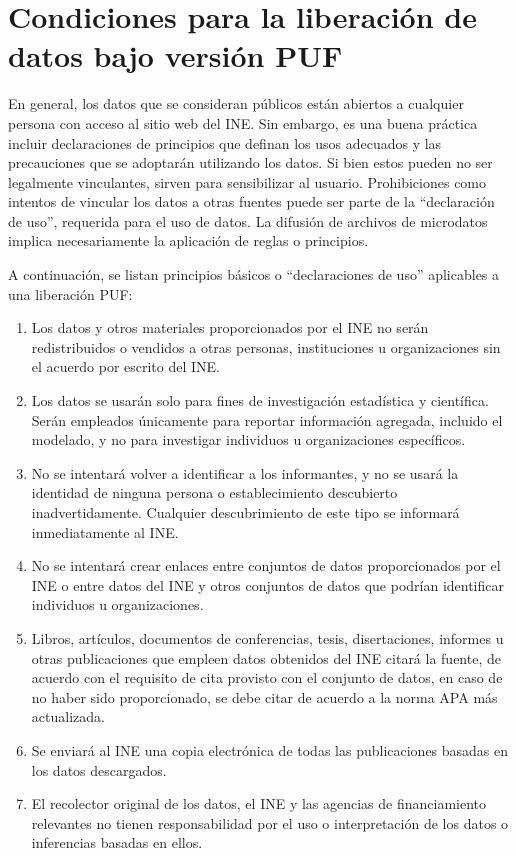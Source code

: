 \documentclass[]{book}
\providecommand{\tightlist}{%
  \setlength{\itemsep}{0pt}\setlength{\parskip}{0pt}}
\theoremstyle{definition}
\theoremstyle{definition}
\theoremstyle{definition}
\theoremstyle{definition}
\theoremstyle{remark}
\begin{document}
\hypertarget{condiciones-para-la-liberaciuxf3n-de-datos-bajo-versiuxf3n-puf}{%
\section{Condiciones para la liberación de datos bajo versión PUF}\label{condiciones-para-la-liberaciuxf3n-de-datos-bajo-versiuxf3n-puf}}

En general, los datos que se consideran públicos están abiertos a cualquier persona con acceso al sitio web del INE. Sin embargo, es una buena práctica incluir declaraciones de principios que definan los usos adecuados y las precauciones que se adoptarán utilizando los datos. Si bien estos pueden no ser legalmente vinculantes, sirven para sensibilizar al usuario. Prohibiciones como intentos de vincular los datos a otras fuentes puede ser parte de la ``declaración de uso'', requerida para el uso de datos. La difusión de archivos de microdatos implica necesariamente la aplicación de reglas o principios.

A continuación, se listan principios básicos o ``declaraciones de uso'' aplicables a una liberación PUF:

\begin{enumerate}
\def\labelenumi{\arabic{enumi}.}
\tightlist
\item
  Los datos y otros materiales proporcionados por el INE no serán redistribuidos o vendidos a otras personas, instituciones u organizaciones sin el acuerdo por escrito del INE.
\item
  Los datos se usarán solo para fines de investigación estadística y científica. Serán empleados únicamente para reportar información agregada, incluido el modelado, y no para investigar individuos u organizaciones específicos.
\item
  No se intentará volver a identificar a los informantes, y no se usará la identidad de ninguna persona o establecimiento descubierto inadvertidamente. Cualquier descubrimiento de este tipo se informará inmediatamente al INE.
\item
  No se intentará crear enlaces entre conjuntos de datos proporcionados por el INE o entre datos del INE y otros conjuntos de datos que podrían identificar individuos u organizaciones.
\item
  Libros, artículos, documentos de conferencias, tesis, disertaciones, informes u otras publicaciones que empleen datos obtenidos del INE citará la fuente, de acuerdo con el requisito de cita provisto con el conjunto de datos, en caso de no haber sido proporcionado, se debe citar de acuerdo a la norma APA más actualizada.
\item
  Se enviará al INE una copia electrónica de todas las publicaciones basadas en los datos descargados.
\item
  El recolector original de los datos, el INE y las agencias de financiamiento relevantes no tienen responsabilidad por el uso o interpretación de los datos o inferencias basadas en ellos.
\end{enumerate}
\end{document}

